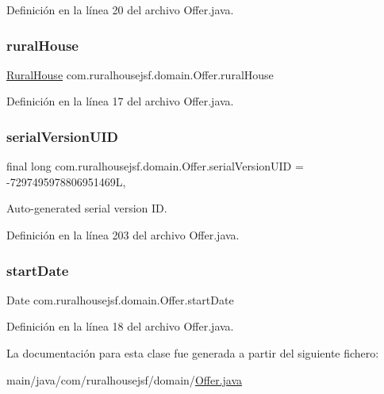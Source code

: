 Definición en la línea 20 del archivo Offer.\+java.

\mbox{\label{a00184_a87036858904c59c964d2c75137a97323}} 
\subsubsection{\texorpdfstring{ruralHouse}{ruralHouse}}
{\footnotesize\ttfamily \mbox{\hyperlink{a00188}{Rural\+House}} com.\+ruralhousejsf.\+domain.\+Offer.\+rural\+House\hspace{0.3cm}{\ttfamily [private]}}



Definición en la línea 17 del archivo Offer.\+java.

\mbox{\label{a00184_a4516c2ff68502d92f1405b8478e9fe6f}} 
\subsubsection{\texorpdfstring{serialVersionUID}{serialVersionUID}}
{\footnotesize\ttfamily final long com.\+ruralhousejsf.\+domain.\+Offer.\+serial\+Version\+U\+ID = -\/7297495978806951469L\hspace{0.3cm}{\ttfamily [static]}, {\ttfamily [private]}}



Auto-\/generated serial version ID. 



Definición en la línea 203 del archivo Offer.\+java.

\mbox{\label{a00184_a3c4e8f6eb72413f6f76b1e4b05404ea8}} 
\subsubsection{\texorpdfstring{startDate}{startDate}}
{\footnotesize\ttfamily Date com.\+ruralhousejsf.\+domain.\+Offer.\+start\+Date\hspace{0.3cm}{\ttfamily [private]}}



Definición en la línea 18 del archivo Offer.\+java.



La documentación para esta clase fue generada a partir del siguiente fichero\+:\begin{DoxyCompactItemize}
\item 
main/java/com/ruralhousejsf/domain/\mbox{\hyperlink{a00044}{Offer.\+java}}\end{DoxyCompactItemize}
